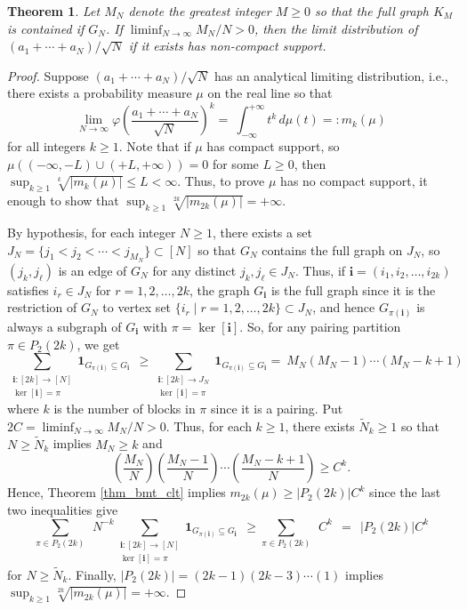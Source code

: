 \documentclass[a4paper,12pt]{extarticle}
\newtheorem{thm}{Theorem}[section]
\theoremstyle{definition}
\theoremstyle{remark}
\newcommand{\abs}[1]{\left\vert {#1} \right\vert}
\begin{document}
\begin{thm}
	Let $M_N$ denote the greatest integer $M \geq 0$ so that the full graph $K_M$ is contained if $G_N$. 
	If $\liminf_{N \to \infty} M_N/N >0$, then the limit distribution of $(a_1 + \cdots + a_N)/\sqrt{N}$ if it exists has non-compact support. 
\end{thm}
\begin{proof}
	Suppose $(a_1 + \cdots + a_N)/\sqrt{N}$ has an analytical limiting distribution, i.e., there exists a probability measure $\mu$ on the real line so that 
	\[
	\lim_{N \to \infty} \varphi \left(\frac{a_1 + \cdots + a_N}{\sqrt{N}}\right)^{k}
	= \ \int_{-\infty}^{+\infty} t^k  \, d \mu(t)
	=: m_k(\mu)
	\]
	for all integers $k \geq 1$. 
	Note that if $\mu$ has compact support, so $\mu((-\infty,-L)\cup (+L,+\infty)) = 0$ for some $L \geq 0$, then $\sup_{k \geq 1} \sqrt[k]{\abs{m_k(\mu)}} \leq L < \infty$. 
	Thus, to prove $\mu$ has no compact support, it enough to show that $\sup_{k \geq 1} \sqrt[2k]{\abs{m_{2k}(\mu)}} = + \infty $. 
	
	
	By hypothesis, for each integer $N \geq 1$, there exists a set $J_N = \{ j_1 < j_2< \cdots < j_{M_N}\} \subset[N] $ so that $G_N$ contains the full graph on $J_N$, so  $(j_k,j_\ell)$ is an edge of $G_N$ for any distinct $j_k,j_\ell \in J_N$. 
	Thus, if $\bm{i} = (i_1,i_2,\ldots,i_{2k})$ satisfies $i_r \in J_N$ for $r=1,2,\ldots,2k$, the graph $G_{\bm i}$ is the full graph since it is the restriction of $G_N$ to vertex set $\{i_r \mid r = 1, 2, \ldots, 2k \} \subset J_N$, and hence $G_{\pi(\bm{i})}$ is always a subgraph of $G_{\bm i}$ with $\pi = \ker[\bm{i}]$. 
	So, for any pairing partition $\pi \in P_2(2k)$, we get   
	\[
	\sum_{\substack{ \bm{i}:[2k]\rightarrow [N] \\ \ker[{\bm i}]=\pi}}  
	\bm{1}_{G_{\pi(\bm{i})}  \subseteq G_{\bm i}}  
	\ \ \geq 
	\sum_{\substack{ \bm{i}:[2k]\rightarrow J_N \\ \ker[{\bm i}]=\pi}}  
	\bm{1}_{G_{\pi(\bm{i})}  \subseteq G_{\bm i}}
	= \ 
	M_N (M_N -1 ) \cdots (M_N-k+1) 
	\]
	where $k$ is the number of blocks in $\pi$ since it is a pairing. 
	Put $2 C = \liminf_{N \to \infty} M_N /N >0$. 
	Thus, for each $k \geq 1$, there exists $\tilde{N}_k \geq 1$ so that $N \geq \tilde{N}_k$ implies $M_N \geq k$ and 
	\[
	\left( \frac{M_N}{N} \right)  \left( \frac{M_N-1}{N} \right) \cdots \left( \frac{M_N-k+1}{N} \right)
	\geq 
	C^k.   
	\]
	Hence, Theorem \ref{thm_bmt_clt} implies $m_{2k}(\mu) \geq \abs{ P_2(2k) } C^k$ since the last two inequalities give 
	\[
	\sum_{\pi \in P_2(2k)}  \ \ 
	N^{-k}
	\sum_{\substack{ \bm{i}:[2k]\rightarrow [N] \\ \ker[{\bm i}]=\pi}}  
	\bm{1}_{G_{\pi(\bm{i})}  \subseteq G_{\bm i}}  
	\ \ \geq 
	\sum_{\pi \in P_2(2k)}  \ \ 
	C^k  
	\ \ =  \ \ 
	\abs{ P_2(2k) } C^k
	\]
	for $N \geq \tilde{N}_k$. 
	Finally, $\abs{ P_2(2k) } = (2k-1)(2k-3) \cdots (1)$ implies $\sup_{k \geq 1} \sqrt[2k]{\abs{m_{2k}(\mu)}} = + \infty$. 
\end{proof}
\end{document}
